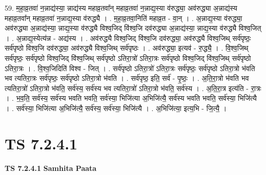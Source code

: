 \documentclass[17pt]{extarticle}
\begin{document}
59. म॒हा॒व्र॒तवा॑ न॒न्नाद्य॑स्या॒ न्नाद्य॑स्य महाव्र॒तवा᳚न् महाव्र॒तवा॑ न॒न्नाद्य॒स्या व॑रुद्ध्या॒ अव॑रुद्ध्या अ॒न्नाद्य॑स्य महाव्र॒तवा᳚न् महाव्र॒तवा॑ न॒न्नाद्य॒स्या व॑रुद्ध्यै । . म॒हा॒व्र॒तवा॒निति॑ महाव्र॒त - वा॒न् । . अ॒न्नाद्य॒स्या व॑रुद्ध्या॒ अव॑रुद्ध्या अ॒न्नाद्य॑स्या॒ न्नाद्य॒स्या व॑रुद्ध्यै विश्व॒जिद् वि॑श्व॒जि दव॑रुद्ध्या अ॒न्नाद्य॑स्या॒ न्नाद्य॒स्या व॑रुद्ध्यै विश्व॒जित् । . अ॒न्नाद्य॒स्येत्य॑न्न - अद्य॑स्य । . अव॑रुद्ध्यै विश्व॒जिद् वि॑श्व॒जि दव॑रुद्ध्या॒ अव॑रुद्ध्यै विश्व॒जिथ् सर्व॑पृष्ठः॒ सर्व॑पृष्ठो विश्व॒जि दव॑रुद्ध्या॒ अव॑रुद्ध्यै विश्व॒जिथ् सर्व॑पृष्ठः । . अव॑रुद्ध्या॒ इत्यव॑ - रु॒द्ध्यै॒ । . वि॒श्व॒जिथ् सर्व॑पृष्ठः॒ सर्व॑पृष्ठो विश्व॒जिद् वि॑श्व॒जिथ् सर्व॑पृष्ठो ऽतिरा॒त्रो॑ ऽतिरा॒त्रः सर्व॑पृष्ठो विश्व॒जिद् वि॑श्व॒जिथ् सर्व॑पृष्ठो ऽतिरा॒त्रः । . वि॒श्व॒जिदिति॑ विश्व - जित् । . सर्व॑पृष्ठो ऽतिरा॒त्रो॑ ऽतिरा॒त्रः सर्व॑पृष्ठः॒ सर्व॑पृष्ठो ऽतिरा॒त्रो भ॑वति भव त्यतिरा॒त्रः सर्व॑पृष्ठः॒ सर्व॑पृष्ठो ऽतिरा॒त्रो भ॑वति । . सर्व॑पृष्ठ॒ इति॒ सर्व॑ - पृ॒ष्ठः॒ । . अ॒ति॒रा॒त्रो भ॑वति भव त्यतिरा॒त्रो॑ ऽतिरा॒त्रो भ॑वति॒ सर्व॑स्य॒ सर्व॑स्य भव त्यतिरा॒त्रो॑ ऽतिरा॒त्रो भ॑वति॒ सर्व॑स्य । . अ॒ति॒रा॒त्र इत्य॑ति - रा॒त्रः । . भ॒व॒ति॒ सर्व॑स्य॒ सर्व॑स्य भवति भवति॒ सर्व॑स्या॒ भिजि॑त्या अ॒भिजि॑त्यै॒ सर्व॑स्य भवति भवति॒ सर्व॑स्या॒ भिजि॑त्यै । . सर्व॑स्या॒ भिजि॑त्या अ॒भिजि॑त्यै॒ सर्व॑स्य॒ सर्व॑स्या॒ भिजि॑त्यै । . अ॒भिजि॑त्या॒ इत्य॒भि - जि॒त्यै॒ । \newline
\pagebreak
{}

\section{ TS 7.2.4.1 }

\textbf{TS 7.2.4.1 } \newline
\textbf{Samhita Paata} \newline
\end{document}
